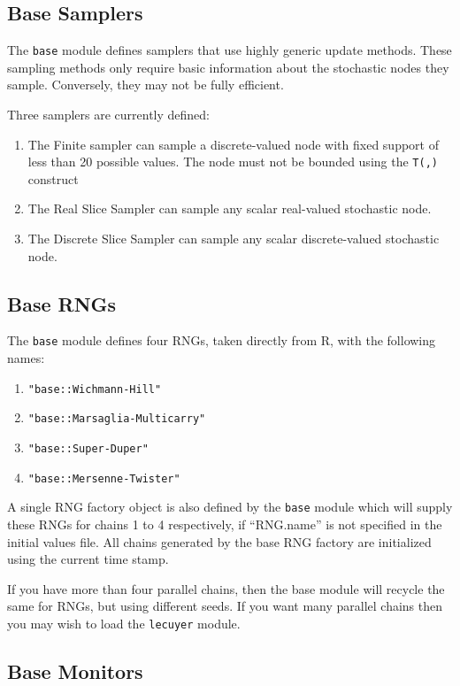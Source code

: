 \documentclass[11pt, a4paper, titlepage]{report}
\newcommand{\R}{\textsf{R}}
\begin{document}
\subsection{Base Samplers}

The \verb+base+ module defines samplers that use highly generic update
methods.  These sampling methods only require basic information about
the stochastic nodes they sample.  Conversely, they may not be fully
efficient.

Three samplers are currently defined:
\begin{enumerate}
\item The Finite sampler can sample a discrete-valued node with
fixed support of less than 20 possible values. The node must not
be bounded using the \verb+T(,)+ construct
\item The Real Slice Sampler can sample any scalar real-valued 
stochastic node.
\item The Discrete Slice Sampler can sample any scalar
discrete-valued stochastic node.
\end{enumerate}

\subsection{Base RNGs}

The \verb+base+ module defines four RNGs, taken directly from \R,
with the following names:
\begin{enumerate}
\item \verb+"base::Wichmann-Hill"+
\item \verb+"base::Marsaglia-Multicarry"+
\item \verb+"base::Super-Duper"+
\item \verb+"base::Mersenne-Twister"+
\end{enumerate}

A single RNG factory object is also defined by the \verb+base+
module which will supply these RNGs for chains 1 to 4 respectively, if
``RNG.name'' is not specified in the initial values file.  All chains
generated by the base RNG factory are initialized using the current
time stamp.

If you have more than four parallel chains, then the base module will
recycle the same for RNGs, but using different seeds. If you want many
parallel chains then you may wish to load the \verb+lecuyer+ module.

\subsection{Base Monitors}
\end{document}
